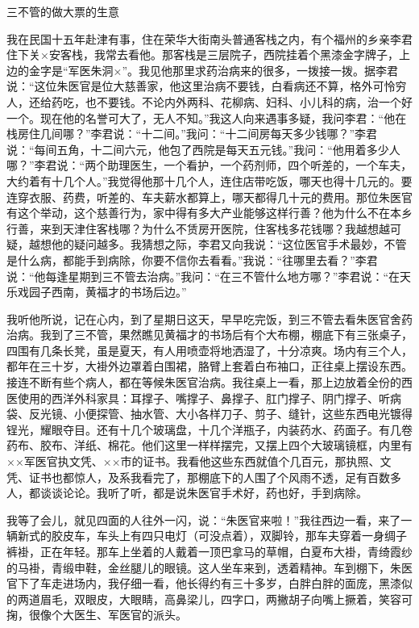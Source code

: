 \documentclass[12pt,UTF8]{ctexbook}
\begin{document}
三不管的做大票的生意


我在民国十五年赴津有事，住在荣华大街南头普通客栈之内，有个福州的乡亲李君住下关×安客栈，我常去看他。那客栈是三层院子，西院挂着个黑漆金字牌子，上边的金字是“军医朱洞×”。我见他那里求药治病来的很多，一拨接一拨。据李君说：“这位朱医官是位大慈善家，他这里治病不要钱，白看病还不算，格外可怜穷人，还给药吃，也不要钱。不论内外两科、花柳病、妇科、小儿科的病，治一个好一个。现在他的名誉可大了，无人不知。”我这人向来遇事多疑，我问李君：“他在栈房住几间哪？”李君说：“十二间。”我问：“十二间房每天多少钱哪？”李君说：“每间五角，十二间六元，他包了西院是每天五元钱。”我问：“他用着多少人哪？”李君说：“两个助理医生，一个看护，一个药剂师，四个听差的，一个车夫，大约着有十几个人。”我觉得他那十几个人，连住店带吃饭，哪天也得十几元的。要连穿衣服、药费，听差的、车夫薪水都算上，哪天都得几十元的费用。那位朱医官有这个举动，这个慈善行为，家中得有多大产业能够这样行善？他为什么不在本乡行善，来到天津住客栈哪？为什么不赁房开医院，住客栈多花钱哪？我越想越可疑，越想他的疑问越多。我猜想之际，李君又向我说：“这位医官手术最妙，不管是什么病，都能手到病除，你要不信你去看看。”我说：“往哪里去看？”李君说：“他每逢星期到三不管去治病。”我问：“在三不管什么地方哪？”李君说：“在天乐戏园子西南，黄福才的书场后边。”

我听他所说，记在心内，到了星期日这天，早早吃完饭，到三不管去看朱医官舍药治病。我到了三不管，果然瞧见黄福才的书场后有个大布棚，棚底下有三张桌子，四围有几条长凳，虽是夏天，有人用喷壶将地洒湿了，十分凉爽。场内有三个人，都年在三十岁，大褂外边罩着白围裙，胳臂上套着白布袖口，正往桌上摆设东西。接连不断有些个病人，都在等候朱医官治病。我往桌上一看，那上边放着全份的西医使用的西洋外科家具：耳撑子、嘴撑子、鼻撑子、肛门撑子、阴门撑子、听病袋、反光镜、小便探管、抽水管、大小各样刀子、剪子、缝针，这些东西电光镀得锃光，耀眼夺目。还有十几个玻璃盘，十几个洋瓶子，内装药水、药面子。有几卷药布、胶布、洋纸、棉花。他们这里一样样摆完，又摆上四个大玻璃镜框，内里有××军医官执文凭、××市的证书。我看他这些东西就值个几百元，那执照、文凭、证书也都惊人，及系我看完了，那棚底下的人围了个风雨不透，足有百数多人，都谈谈论论。我听了听，都是说朱医官手术好，药也好，手到病除。

我等了会儿，就见四面的人往外一闪，说：“朱医官来啦！”我往西边一看，来了一辆新式的胶皮车，车头上有四只电灯（可没点着），双脚铃，那车夫穿着一身绸子裤褂，正在年轻。那车上坐着的人戴着一顶巴拿马的草帽，白夏布大褂，青绮霞纱的马褂，青缎申鞋，金丝腿儿的眼镜。这人坐车来到，透着精神。车到棚下，朱医官下了车走进场内，我仔细一看，他长得约有三十多岁，白胖白胖的面庞，黑漆似的两道眉毛，双眼皮，大眼睛，高鼻梁儿，四字口，两撇胡子向嘴上撅着，笑容可掬，很像个大医生、军医官的派头。
\end{document}
